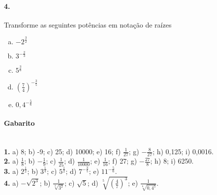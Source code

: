 \documentclass[a4paper,twocolumn,12pt]{article}
\begin{document}
\paragraph*{4.} Transforme as seguintes potências em notação de raízes
\begin{enumerate}[a)]
    \item $-2^{\frac{3}{2}}$
    \item $3^{-\frac{2}{3}}$
    \item $5^{\frac{3}{6}}$
    \item $\left(\frac{7}{4}\right)^{-\frac{3}{5}}$
    \item $0,\!4^{-\frac{5}{6}}$
\end{enumerate}
\vspace*{\fill}

{\footnotesize \color{darkgray}
\paragraph*{Gabarito} \hspace*{\fill}\\
\textbf{1.} a) 8; b) -9; c) 25; d) 10000; e) 16; f) $\frac{1}{27}$; g) $-\frac{8}{27}$; h) 0,125; i) 0,0016.\\
\textbf{2.} a) $\frac{1}{8}$; b) $-\frac{1}{9}$; c) $\frac{1}{25}$; d) $\frac{1}{10000}$; e) $\frac{1}{16}$; f) 27; g) $-\frac{27}{8}$; h) 8; i) 6250.\\
\textbf{3.} a) $2^{\frac{1}{2}}$; b) $3^{\frac{1}{3}}$; c) $5^{\frac{1}{2}}$; d) $7^{-\frac{3}{5}}$; e) $11^{-\frac{5}{6}}$.\\
\textbf{4.} a) $-\sqrt{2^3}$; b) $\frac{1}{\sqrt[3]{3^{2}}}$; c) $\sqrt{5}$; d) $\sqrt[5]{\left(\frac{4}{7}\right)^3}$; e) $\frac{1}{\sqrt[6]{0,\!4^5}}$.
}
\end{document}
